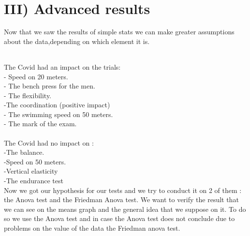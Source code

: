 \documentclass[
	12pt, %
]{fphw_assignment_toc}
\begin{document}
\section{\large\bf III) Advanced results~}

Now that we saw the results of simple stats we can make greater assumptions about the data,depending on which element it is.

\\
The Covid had an impact on the trials:
\\
- Speed on 20 meters.
\\
- The bench press for the men.
\\
- The flexibility.
\\
-The coordination (positive impact)
\\
- The swimming speed on 50 meters.
\\
- The mark of the exam.
\\
\bigskip
\\


The Covid had no impact on :
\\
-The balance.
\\
-Speed on 50 meters.
\\
-Vertical elasticity
\\
-The endurance test
\\


Now we got our hypothesis for our tests and we try to conduct it on 2 of them : the Anova test and the Friedman Anova test. We want to verify the result that we can see on the means graph and the general idea that  we suppose on it. To do so we use the Anova test and in case the Anova test does not conclude due to problems on the value of the data the Friedman anova test.

\newpage
\end{document}
